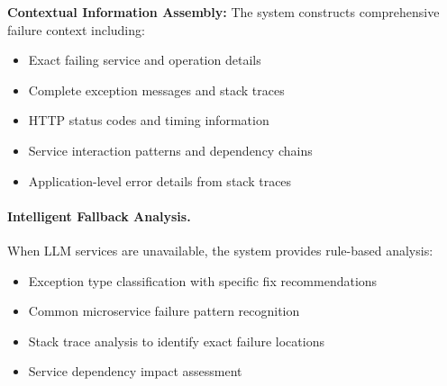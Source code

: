 \documentclass[conference]{IEEEtran}
\begin{document}
\textbf{Contextual Information Assembly:} The system constructs comprehensive failure context including:
\begin{itemize}[leftmargin=*]
\item Exact failing service and operation details
\item Complete exception messages and stack traces
\item HTTP status codes and timing information
\item Service interaction patterns and dependency chains
\item Application-level error details from stack traces
\end{itemize}



\paragraph{Intelligent Fallback Analysis.}
When LLM services are unavailable, the system provides rule-based analysis:

\begin{itemize}[leftmargin=*]
\item Exception type classification with specific fix recommendations
\item Common microservice failure pattern recognition
\item Stack trace analysis to identify exact failure locations
\item Service dependency impact assessment
\end{itemize}
\end{document}
